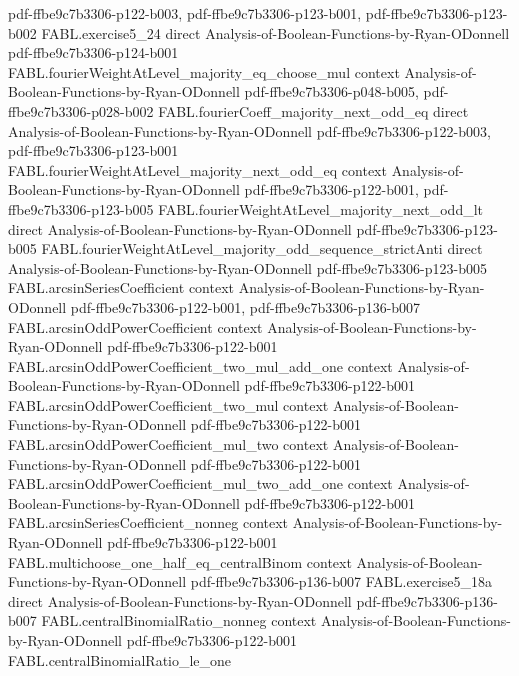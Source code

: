 \begin{theorem}
  {pdf-ffbe9c7b3306-p122-b003,
    pdf-ffbe9c7b3306-p123-b001,
    pdf-ffbe9c7b3306-p123-b002}
\proofstep
  {FABL.exercise5_24}
  {direct}
  {Analysis-of-Boolean-Functions-by-Ryan-ODonnell}
  {pdf-ffbe9c7b3306-p124-b001}
\proofstep
  {FABL.fourierWeightAtLevel_majority_eq_choose_mul}
  {context}
  {Analysis-of-Boolean-Functions-by-Ryan-ODonnell}
  {pdf-ffbe9c7b3306-p048-b005,
    pdf-ffbe9c7b3306-p028-b002}
\proofstep
  {FABL.fourierCoeff_majority_next_odd_eq}
  {direct}
  {Analysis-of-Boolean-Functions-by-Ryan-ODonnell}
  {pdf-ffbe9c7b3306-p122-b003,
    pdf-ffbe9c7b3306-p123-b001}
\proofstep
  {FABL.fourierWeightAtLevel_majority_next_odd_eq}
  {context}
  {Analysis-of-Boolean-Functions-by-Ryan-ODonnell}
  {pdf-ffbe9c7b3306-p122-b001,
    pdf-ffbe9c7b3306-p123-b005}
\proofstep
  {FABL.fourierWeightAtLevel_majority_next_odd_lt}
  {direct}
  {Analysis-of-Boolean-Functions-by-Ryan-ODonnell}
  {pdf-ffbe9c7b3306-p123-b005}
\proofstep
  {FABL.fourierWeightAtLevel_majority_odd_sequence_strictAnti}
  {direct}
  {Analysis-of-Boolean-Functions-by-Ryan-ODonnell}
  {pdf-ffbe9c7b3306-p123-b005}
\proofstep
  {FABL.arcsinSeriesCoefficient}
  {context}
  {Analysis-of-Boolean-Functions-by-Ryan-ODonnell}
  {pdf-ffbe9c7b3306-p122-b001,
    pdf-ffbe9c7b3306-p136-b007}
\proofstep
  {FABL.arcsinOddPowerCoefficient}
  {context}
  {Analysis-of-Boolean-Functions-by-Ryan-ODonnell}
  {pdf-ffbe9c7b3306-p122-b001}
\proofstep
  {FABL.arcsinOddPowerCoefficient_two_mul_add_one}
  {context}
  {Analysis-of-Boolean-Functions-by-Ryan-ODonnell}
  {pdf-ffbe9c7b3306-p122-b001}
\proofstep
  {FABL.arcsinOddPowerCoefficient_two_mul}
  {context}
  {Analysis-of-Boolean-Functions-by-Ryan-ODonnell}
  {pdf-ffbe9c7b3306-p122-b001}
\proofstep
  {FABL.arcsinOddPowerCoefficient_mul_two}
  {context}
  {Analysis-of-Boolean-Functions-by-Ryan-ODonnell}
  {pdf-ffbe9c7b3306-p122-b001}
\proofstep
  {FABL.arcsinOddPowerCoefficient_mul_two_add_one}
  {context}
  {Analysis-of-Boolean-Functions-by-Ryan-ODonnell}
  {pdf-ffbe9c7b3306-p122-b001}
\proofstep
  {FABL.arcsinSeriesCoefficient_nonneg}
  {context}
  {Analysis-of-Boolean-Functions-by-Ryan-ODonnell}
  {pdf-ffbe9c7b3306-p122-b001}
\proofstep
  {FABL.multichoose_one_half_eq_centralBinom}
  {context}
  {Analysis-of-Boolean-Functions-by-Ryan-ODonnell}
  {pdf-ffbe9c7b3306-p136-b007}
\proofstep
  {FABL.exercise5_18a}
  {direct}
  {Analysis-of-Boolean-Functions-by-Ryan-ODonnell}
  {pdf-ffbe9c7b3306-p136-b007}
\proofstep
  {FABL.centralBinomialRatio_nonneg}
  {context}
  {Analysis-of-Boolean-Functions-by-Ryan-ODonnell}
  {pdf-ffbe9c7b3306-p122-b001}
\proofstep
  {FABL.centralBinomialRatio_le_one}

\end{theorem}
